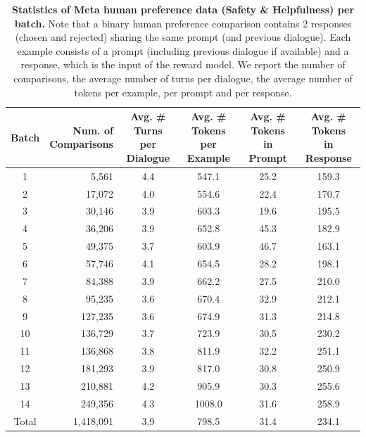 \documentclass{article}
\begin{document}
\begin{table}[t!]
  \centering
  \setlength{\tabcolsep}{4pt}
   {
  \begin{tabular}{crcccc@{}}
    \toprule
    Batch & \shortstack[r]{Num. of \\ Comparisons} & \shortstack{ Avg. \# Turns \\ per Dialogue}  & \shortstack{Avg. \# Tokens \\ per Example} & \shortstack{Avg. \# Tokens \\in Prompt} & \shortstack{Avg. \# Tokens \\ in Response} \\
    \midrule
     1  & 5,561  & 4.4 & 547.1 & 25.2 & 159.3 \\
     2  & 17,072  & 4.0 & 554.6 & 22.4 & 170.7 \\
     3  & 30,146  & 3.9 & 603.3 & 19.6 & 195.5 \\
     4  & 36,206  & 3.9 & 652.8 & 45.3 & 182.9 \\
     5  & 49,375  & 3.7 & 603.9 & 46.7 & 163.1 \\
     6  & 57,746  & 4.1 & 654.5 & 28.2 & 198.1 \\
     7  & 84,388  & 3.9 & 662.2 & 27.5 & 210.0 \\
     8  & 95,235  & 3.6 & 670.4 & 32.9 & 212.1 \\
     9  & 127,235  & 3.6 & 674.9 & 31.3 & 214.8 \\
     10  & 136,729  & 3.7 & 723.9 & 30.5 & 230.2 \\
     11  & 136,868  & 3.8 & 811.9 & 32.2 & 251.1 \\
     12  & 181,293  & 3.9 & 817.0 & 30.8 & 250.9 \\
     13  & 210,881  & 4.2 & 905.9 & 30.3 & 255.6 \\
     14  & 249,356  & 4.3 & 1008.0 & 31.6 & 258.9 \\
    \midrule
    Total & 1,418,091 & 3.9 & 798.5 & 31.4 & 234.1 \\
    \bottomrule
  \end{tabular}}
  \vspace{0.3cm}
  \caption{\textbf{Statistics of Meta human preference data (Safety \& Helpfulness) per batch.} Note that a binary human preference comparison contains 2 responses (chosen and rejected) sharing the same prompt (and previous dialogue). Each example consists of a prompt (including previous dialogue if available) and a response, which is the input of the reward model. We report the number of comparisons, the average number of turns per dialogue, the average number of tokens per example, per prompt and per response.
  \label{tab:meta_human_pref_data}}
\end{table}
\end{document}
